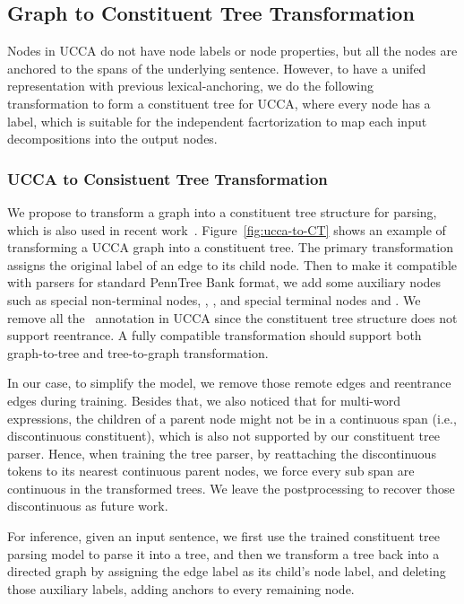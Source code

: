 
\subsection{Graph to Constituent Tree Transformation}
\label{ssec:phr:graph-ct}
Nodes in UCCA do not have node labels or node properties, but all the
nodes are anchored to the spans of the underlying sentence. However,
to have a unifed representation with previous lexical-anchoring, we do
the following transformation to form a constituent tree for UCCA,
where every node has a label, which is suitable for the independent
facrtorization to map each input decompositions into the output nodes.

\subsubsection{UCCA to Consistuent Tree Transformation}
\label{sssec:phr:ucca-to-ct}
We propose to transform a graph into a constituent tree structure for
parsing, which is also used in recent work~\cite{jiang2019hlt}.
Figure~\ref{fig:ucca-to-CT} shows an example of transforming a UCCA
graph into a constituent tree. The primary transformation assigns the
original label of an edge to its child node. Then to make it
compatible with parsers for standard PennTree Bank format, we add some
auxiliary nodes such as special non-terminal nodes, ,
, and special terminal nodes  and . We
remove all the~ annotation in UCCA since the
constituent tree structure does not support reentrance.  A fully
compatible transformation should support both graph-to-tree and
tree-to-graph transformation.

In our case, to simplify the model, we remove those remote edges and
reentrance edges during training. Besides that, we also noticed that
for multi-word expressions, the children of a parent node might not be
in a continuous span (i.e., discontinuous constituent), which is also
not supported by our constituent tree parser. Hence, when training the
tree parser, by reattaching the discontinuous tokens to its nearest
continuous parent nodes, we force every sub span are continuous in the
transformed trees. We leave the postprocessing to recover those
discontinuous as future work.

For inference, given an input sentence, we first use the trained
constituent tree parsing model to parse it into a tree, and then we
transform a tree back into a directed graph by assigning the edge
label as its child's node label, and deleting those auxiliary labels,
adding anchors to every remaining node.


